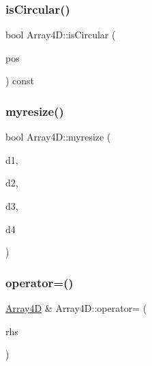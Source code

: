 \mbox{\label{class_array4_d_abbcf6caa1305cd5709e6f194e961614d}} 
\subsubsection{\texorpdfstring{is\+Circular()}{isCircular()}}
{\footnotesize\ttfamily bool Array4\+D\+::is\+Circular (\begin{DoxyParamCaption}\item[{size\+\_\+t}]{pos }\end{DoxyParamCaption}) const}

\mbox{\label{class_array4_d_ae829ad7badd47b721a9ecea2324f3168}} 
\subsubsection{\texorpdfstring{myresize()}{myresize()}}
{\footnotesize\ttfamily bool Array4\+D\+::myresize (\begin{DoxyParamCaption}\item[{index}]{d1,  }\item[{index}]{d2,  }\item[{index}]{d3,  }\item[{index}]{d4 }\end{DoxyParamCaption})}

\mbox{\label{class_array4_d_aa56a432098cf289a2cc340dfc5635634}} 
\subsubsection{\texorpdfstring{operator=()}{operator=()}}
{\footnotesize\ttfamily \mbox{\hyperlink{class_array4_d}{Array4D}} \& Array4\+D\+::operator= (\begin{DoxyParamCaption}\item[{const \mbox{\hyperlink{class_array4_d}{Array4D}} \&}]{rhs }\end{DoxyParamCaption})}

\mbox{\label{class_array4_d_ac31128a6e5ae4659e6be655fecfd6d5c}} 

